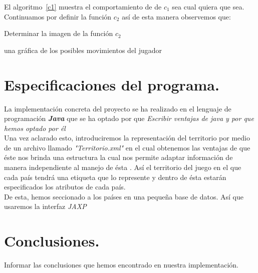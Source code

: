 \documentclass[12pt,twocolumn,draft]{article}
\begin{document}
El algoritmo~\ref{c1} muestra el comportamiento de de $c_{1}$ sea cual quiera que sea.\\

Continuamos por definir la funci\'on $c_{2}$ as\'i de esta manera observemos que:\\


\begin{algorithm}
\begin{algorithmic}[1]
\ENSURE Determinar la imagen de la funci\'on $c_{2}$
\ENDIF
\ENDFOR
\end{algorithmic}
\caption{Definici\'on de la funci\'on $c_{2}$}
\label{c2}
\end{algorithm}



\begin{algorithm}
\begin{algorithmic}[1]
\ENSURE una gr\'afica de los posibles movimientos del jugador
\ELSE 
{}
\ENDIF
\ENDFOR
\end{algorithmic}
\caption{Genera los posibles movimientos del jugador}
\label{c3}
\end{algorithm}


\section{Especificaciones del programa.}

La implementaci\'on concreta del proyecto se ha realizado en el lenguaje de programaci\'on \textbf{\textit{Java}}\cite{JAVA} que se ha optado por que \textit{Escribir ventajas de java y por que hemos optado por \'el}\\

Una vez aclarado esto, introduciremos la representaci\'on del territorio por medio de un archivo llamado \textit{"Territorio.xml"} en el cual obtenemos las ventajas de que \'este nos brinda una estructura la cual nos permite adaptar informaci\'on de manera independiente al manejo de \'esta \cite{xml}. As\'i el territorio del juego en el que cada pa\'is tendr\'a una etiqueta que lo represente y dentro de \'esta estar\'an especificados los atributos de cada pa\'is.\\

De esta, hemos seccionado a los pa\'ises en una pequeña base de datos. As\'i que usaremos la interfaz \textit{JAXP}\cite{JAXP}

\section{Conclusiones.}
Informar las conclusiones que hemos encontrado en nuestra implementaci\'on.\\


\newpage
	
{}
\end{document}
